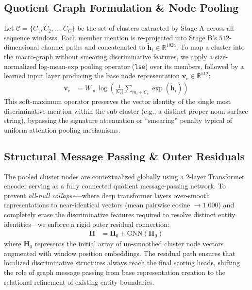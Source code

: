 \documentclass[12pt]{article}
\begin{document}
	\subsection{Quotient Graph Formulation \& Node Pooling}
	Let $\mathcal{C} = \{C_1, C_2, \dots, C_C\}$ be the set of clusters extracted by Stage A across all sequence windows. Each member mention is re-projected into Stage B's $512$-dimensional channel paths and concatenated to $\tilde{\mathbf{h}}_i \in \mathbb{R}^{1024}$. To map a cluster into the macro-graph without smearing discriminative features, we apply a size-normalized log-mean-exp pooling operator (\texttt{lse}) over its members, followed by a learned input layer producing the base node representation $\mathbf{v}_c \in \mathbb{R}^{512}$:
	\begin{align*}
		\mathbf{v}_c &= W_{\text{in}} \, \log \left( \frac{1}{|C_c|} \sum_{m_i \in C_c} \exp(\tilde{\mathbf{h}}_i) \right)
	\end{align*}
	This soft-maximum operator preserves the vector identity of the single most discriminative mention within the sub-cluster (e.g., a distinct proper noun surface string), bypassing the signature attenuation or ``smearing'' penalty typical of uniform attention pooling mechanisms.
	
	\subsection{Structural Message Passing \& Outer Residuals}
	The pooled cluster nodes are contextualized globally using a 2-layer Transformer encoder serving as a fully connected quotient message-passing network. To prevent \emph{all-null collapse}—where deep transformer layers over-smooth representations to near-identical vectors (mean pairwise cosine $\rightarrow 1.000$) and completely erase the discriminative features required to resolve distinct entity identities—we enforce a rigid outer residual connection:
	\begin{align*}
		\mathbf{H} &= \mathbf{H}_0 + \text{GNN}(\mathbf{H}_0)
	\end{align*}
	where $\mathbf{H}_0$ represents the initial array of un-smoothed cluster node vectors augmented with window position embeddings. The residual path ensures that localized discriminative structures always reach the final scoring heads, shifting the role of graph message passing from base representation creation to the relational refinement of existing entity boundaries.
	
\end{document}
